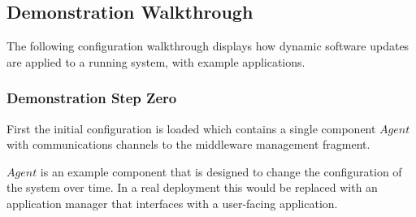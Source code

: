\subsection{Demonstration Walkthrough} \label{sec:demoWalk}

The following configuration walkthrough displays how dynamic software updates are applied to a running system, with example applications.

\lstset{basicstyle=\scriptsize}

\subsubsection{Demonstration Step Zero}

First the initial configuration is loaded which contains a single component $Agent$ with communications channels to the middleware management fragment.

$Agent$ is an example component that is designed to change the configuration of the system over time. In a real deployment this would be replaced with an application manager that interfaces with a user-facing application.


